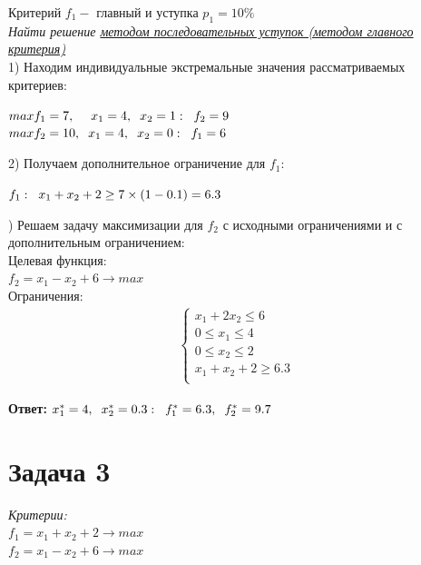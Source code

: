 \documentclass[14pt,fleqn]{extarticle}
\begin{document}
	Критерий $f_1 -$ главный и уступка $p_1 = 10\%$\\
	
	\textit{Найти решение \underline{методом последовательных уступок (методом главного}\\
	\underline{критерия)}}\\
	
	1) Находим индивидуальные экстремальные значения рассматриваемых критериев:
	\begin{center}
		$max f_1 = 7, \hspace{0.45cm} x_1 = 4, \hspace{0.2cm} x_2 = 1: \hspace{0.2cm} f_2 = 9$\\
		$max f_2 = 10, \hspace{0.2cm} x_1 = 4, \hspace{0.2cm} x_2 = 0: \hspace{0.2cm} f_1 = 6$
	\end{center}
	2) Получаем дополнительное ограничение для $f_1$:
	\begin{center}
		$f_1: \hspace{0.2cm} x_1 + x_2 + 2 \geq 7 \times (1-0.1) = 6.3$
	\end{center}
	) Решаем задачу максимизации для $f_2$ с исходными ограничениями и с дополнительным ограничением:\\
	
	Целевая функция:\\
	$f_2 = x_1 - x_2 + 6 \longrightarrow max$\\
	
	Ограничения:
	\begin{align*}
		\begin{cases}
			x_1 + 2x_2 \leq 6\\
			0 \leq x_1 \leq 4\\
			0 \leq x_2 \leq 2\\
			x_1 + x_2 + 2 \geq 6.3\\
		\end{cases}
	\end{align*}

	\textbf{Ответ:} $x_1^* = 4, \hspace{0.2cm} x_2^* = 0.3: \hspace{0.2cm} f_1^* = 6.3, \hspace{0.2cm} f_2^* = 9.7$
	
	\section*{Задача 3}
	\textit{Критерии:}\\
	$f_1 = x_1 + x_2 + 2 \longrightarrow max$\\
	$f_2 = x_1 - x_2 + 6 \longrightarrow max$\\
	
\end{document}
